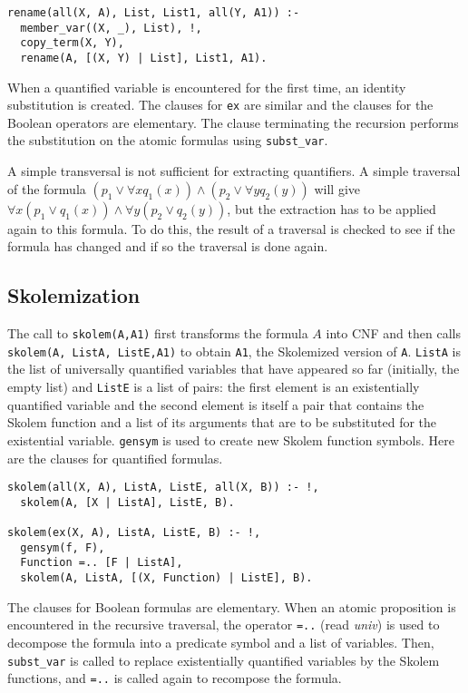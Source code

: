 \documentclass[11pt]{article}
\newcommand*{\p}[1]{\textup{\texttt{#1}}}
\begin{document}
\begin{verbatim}
rename(all(X, A), List, List1, all(Y, A1)) :-
  member_var((X, _), List), !,
  copy_term(X, Y),
  rename(A, [(X, Y) | List], List1, A1).
\end{verbatim}

When a quantified variable is encountered for the first time, an
identity substitution is created. The clauses for \p{ex} are similar and
the clauses for the Boolean operators are elementary. The clause
terminating the recursion performs the substitution on the atomic
formulas using \p{subst\_var}.

A simple transversal is not sufficient for extracting quantifiers. A
simple traversal of the formula $(p_{1} \vee \forall xq_{1}(x)) \wedge
(p_{2} \vee \forall yq_{2}(y))$ will give $\forall x(p_{1} \vee
q_{1}(x)) \wedge \forall y(p_{2} \vee q_{2}(y))$, but the extraction has
to be applied again to this formula. To do this, the result of a
traversal is checked to see if the formula has changed and if so the
traversal is done again.




\subsection{Skolemization}\label{s.skolem}

The call to \p{skolem(A,A1)} first transforms the formula $A$ into CNF
and then calls \p{skolem(A, ListA, ListE,A1)} to obtain \p{A1}, the
Skolemized version of \p{A}. \p{ListA} is the list of universally
quantified variables that have appeared so far (initially, the empty
list) and \p{ListE} is a list of pairs: the first element is an
existentially quantified variable and the second element is itself a
pair that contains the Skolem function and a list of its arguments that
are to be substituted for the existential variable. \p{gensym} is used
to create new Skolem function symbols. Here are the clauses for
quantified formulas.

\begin{verbatim}
skolem(all(X, A), ListA, ListE, all(X, B)) :- !,
  skolem(A, [X | ListA], ListE, B).

skolem(ex(X, A), ListA, ListE, B) :- !,
  gensym(f, F),
  Function =.. [F | ListA],    
  skolem(A, ListA, [(X, Function) | ListE], B).
\end{verbatim}

The clauses for Boolean formulas are elementary. When an atomic
proposition is encountered in the recursive traversal,
the operator \p{=..} (read \emph{univ}) is used to decompose the formula
into a predicate symbol and a list of variables. Then, \p{subst\_var} is
called to replace existentially quantified variables by the Skolem
functions, and \p{=..} is called again to recompose the formula.
\end{document}
